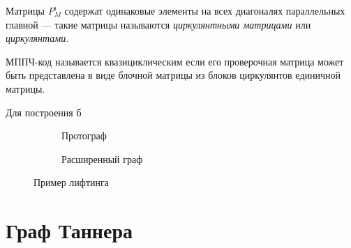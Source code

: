 Матрицы $P^i_M$ содержат одинаковые элементы на всех диагоналях параллельных главной --- такие матрицы
называются \textit{циркулянтными матрицами} или \textit{циркулянтами}.

МППЧ-код называется квазициклическим если его проверочная матрица может быть представлена в виде блочной
матрицы из блоков циркулянтов единичной матрицы.

Для построения б

\begin{figure}[h!]
\centering
\begin{subfigure}{0.2\textwidth}
  \centering
  \caption{Протограф}
  \label{liftingBase}
\end{subfigure}%
\begin{subfigure}{.8\textwidth}
  \centering
  \caption{Расширенный граф}
  \label{liftingExpanded}
\end{subfigure}
\caption{Пример лифтинга}
\end{figure}

\section{Граф Таннера}


\newcommand\colorBox[2]{\setlength{\fboxsep}{2pt}\colorbox{#1!10}{#2}}

